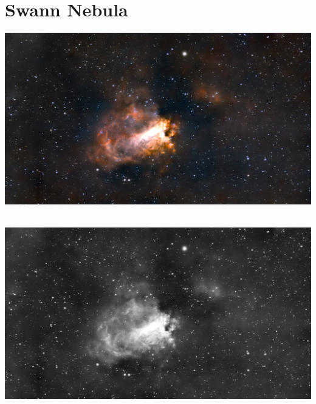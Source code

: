 \ \\\section{Swann Nebula}
\includegraphics[width=\textwidth]{../Imaging//Original/Swann_Nebula.jpg}
{\footnotesize\color{white}


}\ \\
\includegraphics[width=\textwidth]{../Imaging//Grayscale/Swann_Nebula.jpg}
